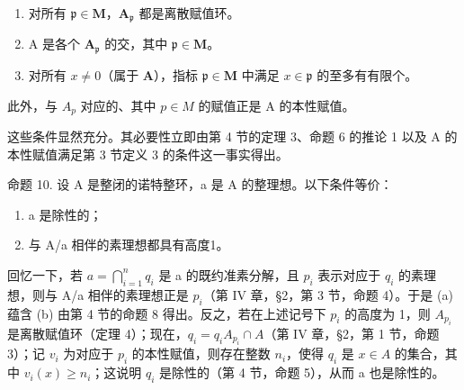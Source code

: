 \begin{enumerate}
\def\labelenumi{(\roman{enumi})}
\item
  对所有 \(\mathfrak{p} \in \mathbf{M}\)，\(\mathbf{A}_{\mathfrak{p}}\) 都是离散赋值环。
\item
  A 是各个 \(\mathbf{A}_{\mathfrak{p}}\) 的交，其中 \(\mathfrak{p} \in \mathbf{M}\)。
\item
  对所有 \(x \neq 0\)（属于 \(\mathbf{A}\)），指标 \(\mathfrak{p} \in \mathbf{M}\) 中满足 \(x \in \mathfrak{p}\) 的至多有有限个。
\end{enumerate}

此外，与 \(A_{p}\) 对应的、其中 \(p \in M\) 的赋值正是 A 的本性赋值。

这些条件显然充分。其必要性立即由第 4 节的定理 3、命题 6 的推论 1 以及 A 的本性赋值满足第 3 节定义 3 的条件这一事实得出。

命题 10. 设 A 是整闭的诺特整环，a 是 A 的整理想。以下条件等价：

\begin{enumerate}
\def\labelenumi{(\alph{enumi})}
\item
  a 是除性的；
\item
  与 A/a 相伴的素理想都具有高度1。
\end{enumerate}

回忆一下，若 \(a = \bigcap_{i=1}^{n} q_i\) 是 a 的既约准素分解，且 \(p_i\) 表示对应于 \(q_i\) 的素理想，则与 A/a 相伴的素理想正是 \(p_i\)（第 IV 章，§2，第 3 节，命题 4）。于是 (a) 蕴含 (b) 由第 4 节的命题 8 得出。反之，若在上述记号下 \(p_i\) 的高度为 1，则 \(A_{p_i}\) 是离散赋值环（定理 4）；现在，\(q_i = q_i A_{p_i} \cap A\)（第 IV 章，§2，第 1 节，命题 3）；记 \(v_i\) 为对应于 \(p_i\) 的本性赋值，则存在整数 \(n_i\)，使得 \(q_i\) 是 \(x \in A\) 的集合，其中 \(v_i(x) \geqslant n_i\)；这说明 \(q_i\) 是除性的（第 4 节，命题 5），从而 a 也是除性的。

